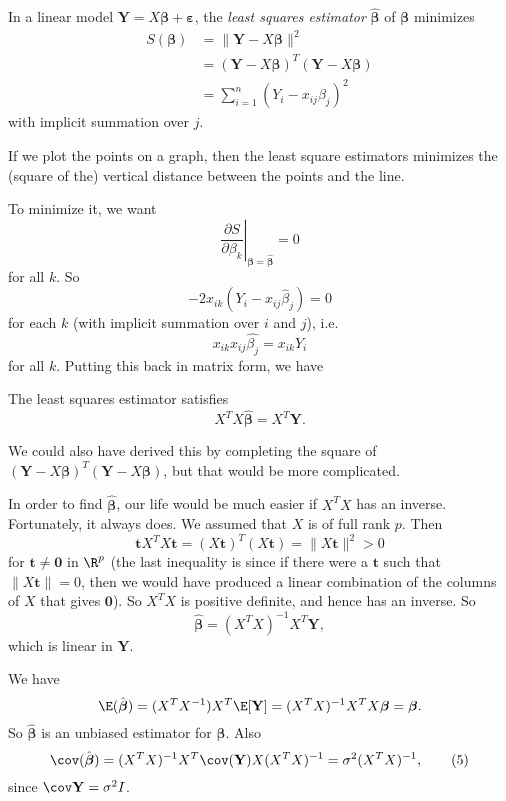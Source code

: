 \documentclass[a4paper]{article}
\begin{document}
\begin{defi}
  In a linear model $\mathbf{Y} = X\boldsymbol\beta + \boldsymbol\varepsilon$, the \emph{least squares estimator} $\hat{\boldsymbol\beta}$ of $\boldsymbol\beta$ minimizes
  \begin{align*}
    S(\boldsymbol\beta) &= \|\mathbf{Y} - X\boldsymbol\beta\|^2\\
    &= (\mathbf{Y} - X\boldsymbol\beta)^T(\mathbf{Y} - X\boldsymbol\beta)\\
    &= \sum_{i = 1}^n (Y_i - x_{ij}\beta_j)^2
  \end{align*}
  with implicit summation over $j$.

  If we plot the points on a graph, then the least square estimators minimizes the (square of the) vertical distance between the points and the line.
\end{defi}

To minimize it, we want
\[
  \left.\frac{\partial S}{\partial \beta_k}\right|_{\boldsymbol\beta = \hat{\boldsymbol\beta}} = 0
\]
for all $k$. So
\[
  -2 x_{ik}(Y_i - x_{ij}\hat{\beta}_j) = 0
\]
for each $k$ (with implicit summation over $i$ and $j$), i.e.\
\[
  x_{ik}x_{ij}\hat{\beta_j} = x_{ik}Y_i
\]
for all $k$. Putting this back in matrix form, we have
\begin{prop}
  The least squares estimator satisfies
  \[
    X^TX\hat{\boldsymbol\beta} = X^T\mathbf{Y}.\tag{3}
  \]
\end{prop}
We could also have derived this by completing the square of $(\mathbf{Y} - X\boldsymbol\beta)^T(\mathbf{Y} - X\boldsymbol\beta)$, but that would be more complicated.

In order to find $\hat{\boldsymbol\beta}$, our life would be much easier if $X^TX$ has an inverse. Fortunately, it always does. We assumed that $X$ is of full rank $p$. Then
\[
  \mathbf{t}X^TX\mathbf{t} = (X\mathbf{t})^T(X\mathbf{t}) = \|X\mathbf{t}\|^2 > 0
\]
for $\mathbf{t}\not= \mathbf{0}$ in $\R^p$ (the last inequality is since if there were a $\mathbf{t}$ such that $\|X\mathbf{t}\| = 0$, then we would have produced a linear combination of the columns of $X$ that gives $\mathbf{0}$). So $X^TX$ is positive definite, and hence has an inverse. So
\[
  \hat{\boldsymbol\beta} = (X^TX)^{-1} X^T\mathbf{Y},\tag{4}
\]
which is linear in $\mathbf{Y}$.

We have
\[
  \E(\hat{\boldsymbol\beta}) = (X^TX^{-1})X^T\E[\mathbf{Y}] = (X^TX)^{-1}X^TX\boldsymbol\beta = \boldsymbol\beta.
\]
So $\hat{\boldsymbol\beta}$ is an unbiased estimator for $\boldsymbol\beta$. Also
\[
  \cov(\hat{\boldsymbol\beta}) = (X^TX)^{-1}X^T \cov(\mathbf{Y})X(X^TX)^{-1} = \sigma^2(X^TX)^{-1} ,\tag{5}
\]
since $\cov \mathbf{Y} = \sigma^2 I$.
\end{document}
